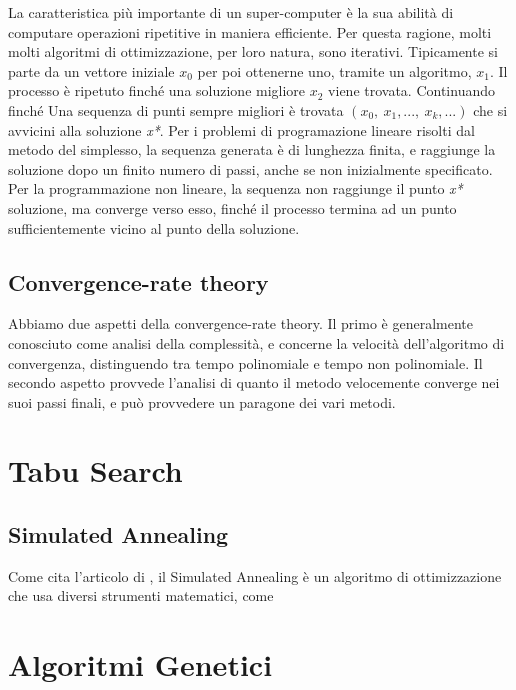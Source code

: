 \documentclass{article}
\begin{document}
La caratteristica più importante di un super-computer è la sua abilità di
computare operazioni ripetitive in maniera efficiente. Per questa ragione,
molti molti algoritmi di ottimizzazione, per loro natura, sono iterativi.
Tipicamente si parte da un vettore iniziale \(x_0\) per poi ottenerne uno, tramite un algoritmo, \(x_1\).
Il processo è ripetuto finché una soluzione migliore \(x_2\) viene trovata. Continuando finché 
Una sequenza di punti sempre migliori è trovata \( (x_0 , \ x_1 , ..., \ x_k , ...  )\) che si avvicini 
alla soluzione \textit{x*}. Per i problemi di programazione lineare risolti dal metodo del simplesso,
la sequenza generata è di lunghezza finita, e raggiunge la soluzione dopo un finito
numero di passi, anche se non inizialmente specificato.
Per la programmazione non lineare, la sequenza non raggiunge il punto \textit{x*} soluzione, 
ma converge verso esso, finché il processo termina ad un punto sufficientemente vicino al 
punto della soluzione.

\subsection{Convergence-rate theory}

Abbiamo due aspetti della convergence-rate theory. Il primo è generalmente 
conosciuto come analisi della complessità, e concerne la velocità dell'algoritmo 
di convergenza, distinguendo tra tempo polinomiale e tempo non polinomiale.
Il secondo aspetto provvede l'analisi di quanto il metodo velocemente converge 
nei suoi passi finali, e può provvedere un paragone dei vari metodi.

\section{Tabu Search}

\subsection{Simulated Annealing}

Come cita l'articolo di  \textcite{SimulatedAnnealing01}, il Simulated Annealing
è un algoritmo di ottimizzazione che usa diversi strumenti matematici, come  

\section{Algoritmi Genetici}

\printbibliography[title = {Bibliografia e crediti}]
\end{document}
